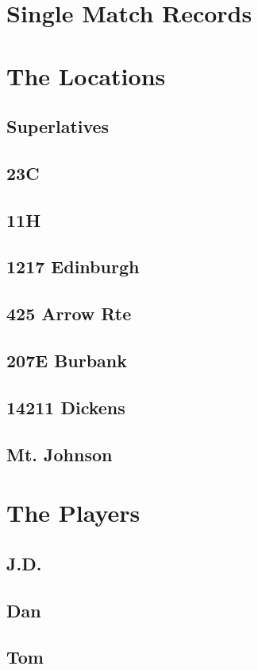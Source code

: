 \documentclass[a4paper,twoside,titlepage]{book}
\begin{document}
    \chapter{Single Match Records}
    \chapter{The Locations}
      \section{Superlatives}
      \section{23C}
      \section{11H}
      \section{1217 Edinburgh}
      \section{425 Arrow Rte}
      \section{207E Burbank} 
      \section{14211 Dickens}
      \section{Mt. Johnson}
    \chapter{The Players}
      \section{J.D.}
      \section{Dan}
      \section{Tom}
\end{document}
